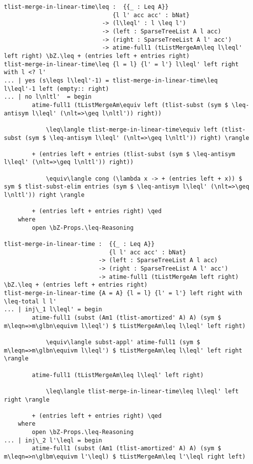 \begin{lstlisting}[caption={Merging heaps},label={lst:appendix:heap:merge}]
tlist-merge-in-linear-time\leq :  {{_ : Leq A}}
                               {l l' acc acc' : bNat}
                            -> (l\leql' : l \leq l')
                            -> (left : SparseTreeList A l acc)
                            -> (right : SparseTreeList A l' acc')
                            -> atime-full1 (tListMergeAm\leq l\leql' left right) \bZ.\leq + (entries left + entries right)
tlist-merge-in-linear-time\leq {l = l} {l' = l'} l\leql' left right with l <? l'
... | yes (s\leqs l\leql'-1) = tlist-merge-in-linear-time\leq l\leql'-1 left (empty:: right)
... | no l\nltl'  = begin
        atime-full1 (tListMergeAm\equiv left (tlist-subst (sym $ \leq-antisym l\leql' (\nlt=>\geq l\nltl')) right))

            \leq\langle tlist-merge-in-linear-time\equiv left (tlist-subst (sym $ \leq-antisym l\leql' (\nlt=>\geq l\nltl')) right) \rangle

        + (entries left + entries (tlist-subst (sym $ \leq-antisym l\leql' (\nlt=>\geq l\nltl')) right))

            \equiv\langle cong (\lambda x -> + (entries left + x)) $ sym $ tlist-subst-elim entries (sym $ \leq-antisym l\leql' (\nlt=>\geq l\nltl')) right \rangle

        + (entries left + entries right) \qed
    where
        open \bZ-Props.\leq-Reasoning

tlist-merge-in-linear-time :  {{_ : Leq A}}
                              {l l' acc acc' : bNat}
                           -> (left : SparseTreeList A l acc)
                           -> (right : SparseTreeList A l' acc')
                           -> atime-full1 (tListMergeAm left right) \bZ.\leq + (entries left + entries right)
tlist-merge-in-linear-time {A = A} {l = l} {l' = l'} left right with \leq-total l l'
... | inj\_1 l\leql' = begin
        atime-full1 (subst (Am1 (tlist-amortized' A) A) (sym $ m\leqn=>m\glbn\equivm l\leql') $ tListMergeAm\leq l\leql' left right)

            \equiv\langle subst-appl' atime-full1 (sym $ m\leqn=>m\glbn\equivm l\leql') $ tListMergeAm\leq l\leql' left right \rangle

        atime-full1 (tListMergeAm\leq l\leql' left right)

            \leq\langle tlist-merge-in-linear-time\leq l\leql' left right \rangle

        + (entries left + entries right) \qed
    where
        open \bZ-Props.\leq-Reasoning
... | inj\_2 l'\leql = begin
        atime-full1 (subst (Am1 (tlist-amortized' A) A) (sym $ m\leqn=>n\glbm\equivm l'\leql) $ tListMergeAm\leq l'\leql right left)


\end{lstlisting}
